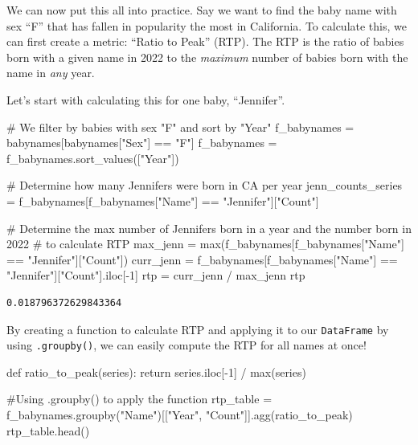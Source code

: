 \documentclass[
  letterpaper,
  DIV=11,
  numbers=noendperiod]{scrreprt}
\newenvironment{Shaded}{\begin{snugshade}}{\end{snugshade}}
\newcommand{\BuiltInTok}[1]{\textcolor[rgb]{0.00,0.23,0.31}{#1}}
\newcommand{\CommentTok}[1]{\textcolor[rgb]{0.37,0.37,0.37}{#1}}
\newcommand{\ControlFlowTok}[1]{\textcolor[rgb]{0.00,0.23,0.31}{#1}}
\newcommand{\DecValTok}[1]{\textcolor[rgb]{0.68,0.00,0.00}{#1}}
\newcommand{\KeywordTok}[1]{\textcolor[rgb]{0.00,0.23,0.31}{#1}}
\newcommand{\NormalTok}[1]{\textcolor[rgb]{0.00,0.23,0.31}{#1}}
\newcommand{\OperatorTok}[1]{\textcolor[rgb]{0.37,0.37,0.37}{#1}}
\newcommand{\StringTok}[1]{\textcolor[rgb]{0.13,0.47,0.30}{#1}}
\begin{document}
We can now put this all into practice. Say we want to find the baby name
with sex ``F'' that has fallen in popularity the most in California. To
calculate this, we can first create a metric: ``Ratio to Peak'' (RTP).
The RTP is the ratio of babies born with a given name in 2022 to the
\emph{maximum} number of babies born with the name in \emph{any} year.

Let's start with calculating this for one baby, ``Jennifer''.

\begin{Shaded}
\begin{Highlighting}[]
\CommentTok{\# We filter by babies with sex "F" and sort by "Year"}
\NormalTok{f\_babynames }\OperatorTok{=}\NormalTok{ babynames[babynames[}\StringTok{"Sex"}\NormalTok{] }\OperatorTok{==} \StringTok{"F"}\NormalTok{]}
\NormalTok{f\_babynames }\OperatorTok{=}\NormalTok{ f\_babynames.sort\_values([}\StringTok{"Year"}\NormalTok{])}

\CommentTok{\# Determine how many Jennifers were born in CA per year}
\NormalTok{jenn\_counts\_series }\OperatorTok{=}\NormalTok{ f\_babynames[f\_babynames[}\StringTok{"Name"}\NormalTok{] }\OperatorTok{==} \StringTok{"Jennifer"}\NormalTok{][}\StringTok{"Count"}\NormalTok{]}

\CommentTok{\# Determine the max number of Jennifers born in a year and the number born in 2022 }
\CommentTok{\# to calculate RTP}
\NormalTok{max\_jenn }\OperatorTok{=} \BuiltInTok{max}\NormalTok{(f\_babynames[f\_babynames[}\StringTok{"Name"}\NormalTok{] }\OperatorTok{==} \StringTok{"Jennifer"}\NormalTok{][}\StringTok{"Count"}\NormalTok{])}
\NormalTok{curr\_jenn }\OperatorTok{=}\NormalTok{ f\_babynames[f\_babynames[}\StringTok{"Name"}\NormalTok{] }\OperatorTok{==} \StringTok{"Jennifer"}\NormalTok{][}\StringTok{"Count"}\NormalTok{].iloc[}\OperatorTok{{-}}\DecValTok{1}\NormalTok{]}
\NormalTok{rtp }\OperatorTok{=}\NormalTok{ curr\_jenn }\OperatorTok{/}\NormalTok{ max\_jenn}
\NormalTok{rtp}
\end{Highlighting}
\end{Shaded}

\begin{verbatim}
0.018796372629843364
\end{verbatim}

By creating a function to calculate RTP and applying it to our
\texttt{DataFrame} by using \texttt{.groupby()}, we can easily compute
the RTP for all names at once!

\begin{Shaded}
\begin{Highlighting}[]
\KeywordTok{def}\NormalTok{ ratio\_to\_peak(series):}
    \ControlFlowTok{return}\NormalTok{ series.iloc[}\OperatorTok{{-}}\DecValTok{1}\NormalTok{] }\OperatorTok{/} \BuiltInTok{max}\NormalTok{(series)}

\CommentTok{\#Using .groupby() to apply the function}
\NormalTok{rtp\_table }\OperatorTok{=}\NormalTok{ f\_babynames.groupby(}\StringTok{"Name"}\NormalTok{)[[}\StringTok{"Year"}\NormalTok{, }\StringTok{"Count"}\NormalTok{]].agg(ratio\_to\_peak)}
\NormalTok{rtp\_table.head()}
\end{Highlighting}
\end{Shaded}
\end{document}
